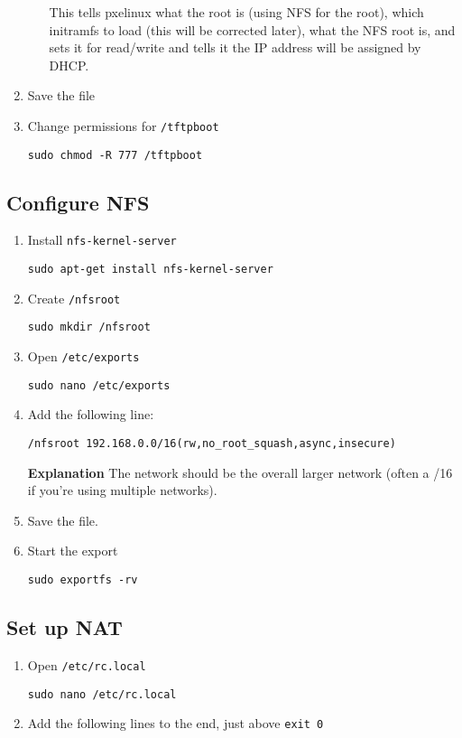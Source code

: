 \documentclass{article}
\begin{document}
\begin{flushleft}
\begin{enumerate}
\begin{enumerate}
    This tells pxelinux what the root is (using NFS for the root), which initramfs to load (this will be corrected later), what the NFS root is, and sets it for read/write and tells it the IP address will be assigned by DHCP.
  \end{enumerate}
  \item Save the file
  \item Change permissions for \verb|/tftpboot|

  \verb|sudo chmod -R 777 /tftpboot|
\end{enumerate}
\subsection{Configure NFS}
  \begin{enumerate}
    \item Install \verb|nfs-kernel-server|

    \verb|sudo apt-get install nfs-kernel-server|

    \item Create \verb|/nfsroot|

    \verb|sudo mkdir /nfsroot|

    \item Open \verb|/etc/exports|

    \verb|sudo nano /etc/exports|

    \item Add the following line:

    \verb|/nfsroot 192.168.0.0/16(rw,no_root_squash,async,insecure)|

    \textbf{Explanation}
    The network should be the overall larger network (often a /16 if you're using multiple networks).

    \item Save the file.

    \item Start the export

    \verb|sudo exportfs -rv|
  \end{enumerate}
\subsection{Set up NAT}
  \begin{enumerate}
    \item Open \verb|/etc/rc.local|

    \verb|sudo nano /etc/rc.local|

    \item Add the following lines to the end, just above \verb|exit 0|


\end{enumerate}
\end{flushleft}
\end{document}
